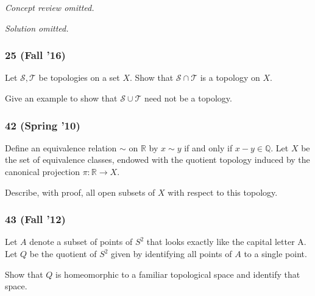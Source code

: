 \emph{Concept review omitted.}

\emph{Solution omitted.}

\hypertarget{fall-16}{%
\subsubsection{25 (Fall '16)}\label{fall-16}}

\begin{problem}[?]

Let \({\mathcal{S}}, {\mathcal{T}}\) be topologies on a set \(X\). Show
that \({\mathcal{S}}\cap {\mathcal{T}}\) is a topology on \(X\).

Give an example to show that \({\mathcal{S}}\cup {\mathcal{T}}\) need
not be a topology.

\end{problem}

\hypertarget{spring-10-1}{%
\subsubsection{42 (Spring '10)}\label{spring-10-1}}

\begin{problem}[?]

Define an equivalence relation \(\sim\) on \({\mathbb{R}}\) by
\(x \sim y\) if and only if \(x - y \in {\mathbb{Q}}\). Let \(X\) be the
set of equivalence classes, endowed with the quotient topology induced
by the canonical projection \(\pi : {\mathbb{R}}\to X\).

Describe, with proof, all open subsets of \(X\) with respect to this
topology.

\end{problem}

\hypertarget{fall-12}{%
\subsubsection{43 (Fall '12)}\label{fall-12}}

\begin{problem}[?]

Let \(A\) denote a subset of points of \(S^2\) that looks exactly like
the capital letter A. Let \(Q\) be the quotient of \(S^2\) given by
identifying all points of \(A\) to a single point.

Show that \(Q\) is homeomorphic to a familiar topological space and
identify that space.

\end{problem}

